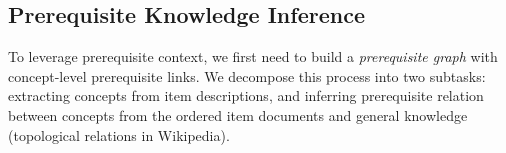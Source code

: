 
\subsection{Prerequisite Knowledge Inference}
To leverage prerequisite context, we first need to build a \textit{prerequisite graph} with concept-level prerequisite links.
We decompose this process into two subtasks: 
extracting concepts from item descriptions, 
and inferring prerequisite relation between concepts from the ordered item documents and general knowledge (topological relations in Wikipedia).



